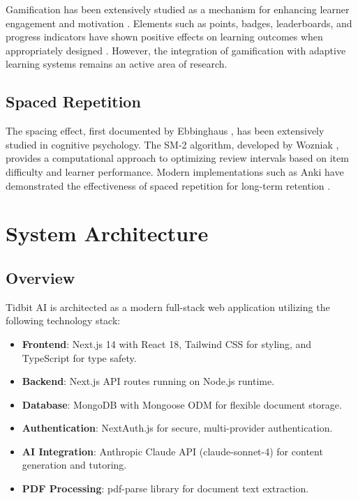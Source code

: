 \documentclass[conference]{IEEEtran}
\begin{document}
Gamification has been extensively studied as a mechanism for enhancing learner engagement and motivation \cite{dicheva2015gamification}. Elements such as points, badges, leaderboards, and progress indicators have shown positive effects on learning outcomes when appropriately designed \cite{hamari2014does}. However, the integration of gamification with adaptive learning systems remains an active area of research.

\subsection{Spaced Repetition}

The spacing effect, first documented by Ebbinghaus \cite{ebbinghaus1885memory}, has been extensively studied in cognitive psychology. The SM-2 algorithm, developed by Wozniak \cite{wozniak1990optimization}, provides a computational approach to optimizing review intervals based on item difficulty and learner performance. Modern implementations such as Anki have demonstrated the effectiveness of spaced repetition for long-term retention \cite{settles2016trainable}.

\section{System Architecture}

\subsection{Overview}

Tidbit AI is architected as a modern full-stack web application utilizing the following technology stack:

\begin{itemize}
    \item \textbf{Frontend}: Next.js 14 with React 18, Tailwind CSS for styling, and TypeScript for type safety.
    \item \textbf{Backend}: Next.js API routes running on Node.js runtime.
    \item \textbf{Database}: MongoDB with Mongoose ODM for flexible document storage.
    \item \textbf{Authentication}: NextAuth.js for secure, multi-provider authentication.
    \item \textbf{AI Integration}: Anthropic Claude API (claude-sonnet-4) for content generation and tutoring.
    \item \textbf{PDF Processing}: pdf-parse library for document text extraction.
\end{itemize}
\end{document}

